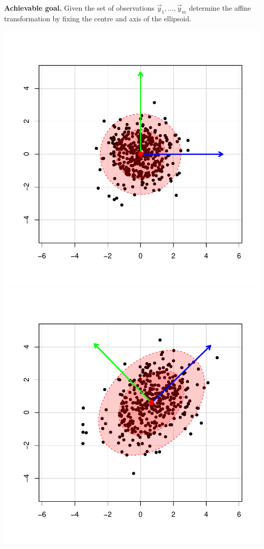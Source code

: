 \documentclass[landscape,footrule]{foils}
\begin{document}

\textbf{Achievable goal.}
Given the set of observations $\vec{y}_1,\ldots, \vec{y}_m$ determine the affine transformation by fixing the centre and axis of the ellipsoid.


\begin{center}
\includegraphics[scale=0.55]{source-distribution-iii.pdf}
\includegraphics[scale=0.55]{target-distribution-iii.pdf}
\end{center}\vspace*{-1cm}
\end{document}
